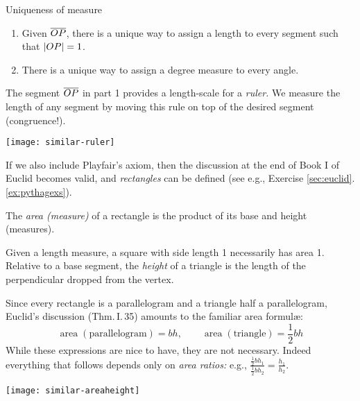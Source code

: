 \begin{thm}{Uniqueness of measure}{}
	\begin{enumerate}
	  \item Given $\overline{OP}$, there is a unique way to assign a length to every segment such that $\left| OP\right|=1$.
	  \item There is a unique way to assign a degree measure to every angle.
	\end{enumerate}
\end{thm}

\begin{minipage}[t]{0.49\linewidth}\vspace{0pt}
	The segment $\overline{OP}$ in part 1 provides a length-scale for a \emph{ruler.} We measure the length of any segment by moving this rule on top of the desired segment (congruence!).
\end{minipage}
\hfill
\begin{minipage}[t]{0.49\linewidth}\vspace{-5pt}
	\flushright
	\texttt{[image: similar-ruler]}
\end{minipage}


\goodbreak


If we also include Playfair's axiom, then the discussion at the end of Book I of Euclid becomes valid, and \emph{rectangles} can be defined (see e.g., Exercise \ref*{sec:euclid}.\ref{ex:pythagexs}).

\begin{defn}{}{}
	The \emph{area (measure)} of a rectangle is the product of its base and height (measures).
\end{defn}

Given a length measure, a square with side length 1 necessarily has area 1. Relative to a base segment, the \emph{height} of a triangle is the length of the perpendicular dropped from the vertex.\par

\begin{minipage}[t]{0.8\linewidth}\vspace{-8pt}
	Since every rectangle is a parallelogram and a triangle half a parallelogram, Euclid's discussion (Thm.\,I.\,35) amounts to the familiar area formulæ:
	\[
		\operatorname{area}(\text{parallelogram})=bh,\qquad \operatorname{area}(\text{triangle})=\frac 12bh
	\]
	While these expressions are nice to have, they are not necessary. Indeed everything that follows depends only on \emph{area ratios:} e.g., $\frac{\frac 12bh_1}{\frac 12bh_2}=\frac{h_1}{h_2}$.
\end{minipage}
\hfill
\begin{minipage}[t]{0.19\linewidth}\vspace{-8pt}
	\flushright
	\texttt{[image: similar-areaheight]}
\end{minipage}



